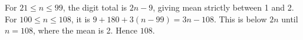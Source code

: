 For $21\le n\le99$, the digit total is $2n-9$, giving mean strictly between 1 and 2. For $100\le n\le108$, it is $9+180+3(n-99)=3n-108$. This is below $2n$ until $n=108$, where the mean is 2. Hence $\boxed{108}$.
